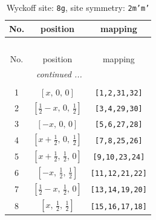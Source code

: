 \documentclass[fleqn,8pt]{jsarticle}
\begin{document}
\begin{longtable}{ccc}
\caption{Wyckoff site: {\tt 8g}, site symmetry: {\tt 2m'm'}}
 \\
 \hline \hline
No. & position & mapping \\ \hline \endfirsthead

\multicolumn{2}{l}{\tablename\ \thetable{}} \\
 \hline \hline
No. & position & mapping \\ \hline \endhead

 \hline \hline
\multicolumn{2}{r}{\footnotesize\it continued ...} \\ \endfoot

 \hline \hline
\multicolumn{2}{r}{} \\ \endlastfoot

1 & $\left[ x,\, 0,\, 0 \right]$ & {\tt [1,2,31,32]} \\ \hline
2 & $\left[ \frac{1}{2} - x,\, 0,\, \frac{1}{2} \right]$ & {\tt [3,4,29,30]} \\ \hline
3 & $\left[ - x,\, 0,\, 0 \right]$ & {\tt [5,6,27,28]} \\ \hline
4 & $\left[ x + \frac{1}{2},\, 0,\, \frac{1}{2} \right]$ & {\tt [7,8,25,26]} \\ \hline
5 & $\left[ x + \frac{1}{2},\, \frac{1}{2},\, 0 \right]$ & {\tt [9,10,23,24]} \\ \hline
6 & $\left[ - x,\, \frac{1}{2},\, \frac{1}{2} \right]$ & {\tt [11,12,21,22]} \\ \hline
7 & $\left[ \frac{1}{2} - x,\, \frac{1}{2},\, 0 \right]$ & {\tt [13,14,19,20]} \\ \hline
8 & $\left[ x,\, \frac{1}{2},\, \frac{1}{2} \right]$ & {\tt [15,16,17,18]} \\
\end{longtable}
\renewcommand{\arraystretch}{1.2}
\end{document}
